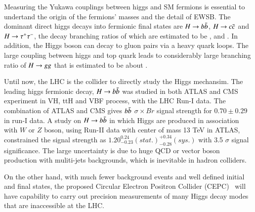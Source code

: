Measuring the Yukawa couplings between higgs and SM fermions is essential to undertand the origin of the fermions' masses and the detail of EWSB.
The dominant direct higgs decays into fermionic final states are $H\rightarrow b\bar{b}$, $H\rightarrow c\bar{c}$ and $H\rightarrow\tau^{+}\tau^{-}$, 
the decay branching ratios of which are estimated to be ,  and . 
In addition, the Higgs boson can decay to gluon pairs via a heavy quark loops. The large coupling between higgs and top quark leads to considerably large 
branching ratio of $H\rightarrow gg$ that is estimated to be about . 
\par
Until now, the LHC is the collider to directly study the Higgs mechansim. 
The leading higgs fermionic decay,  $H\rightarrow b\bar{b}$ was studied in both ATLAS and CMS experiment in VH\cite{VH_bb_atlas,VH_bb_cms}, ttH\cite{ttH_bb_cms} and VBF\cite{VBF_bb_atlas,VBF_bb_cms} process, with the LHC Run-I data.
The combination of ATLAS and CMS gives $b\bar{b}$ $\sigma\times Br$ signal strength for $0.70\pm0.29$ in run-I data\cite{higgs_atlas_cms_combine}. 
A study on $H\rightarrow b\bar{b}$ in which Higgs are produced in association with $W$ or $Z$ boson, using  Run-II data with center of mass 13 TeV in ATLAS, 
constrained the signal strength as $1.20^{0.24}_{-0.23}(stat.)^{+0.34}_{-0.28}(sys.)$ \cite{VHbb_atlas_run2} with 3.5 $\sigma$ signal significance.
The large uncertainty is due to huge QCD or vector boson production with muliti-jets backgrounds, which is inevitable in hadron colliders. 
\par
On the other hand, with much fewer background events and well defined initial and final states, the proposed Circular Electron Positron Collider (CEPC)~\cite{CEPC_preCDR} 
will have capability to carry out precision measurements of many Higgs decay modes that are inaccessible at the LHC.
